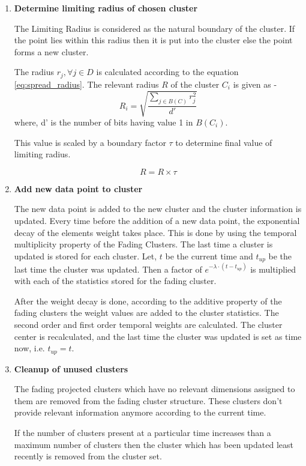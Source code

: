 \documentclass[review,twocolumn,5p]{elsarticle}
\begin{document}
\begin{enumerate}
\item \textbf{Determine limiting radius of chosen cluster}

The Limiting Radius is considered as the natural boundary of the cluster. If the point lies within this radius then it is put into the cluster else the point forms a new cluster. 

The radius $r_j, \forall j \in D$ is calculated according to the equation \ref{eq:spread_radius}. The relevant radius $R$ of the cluster $C_i$ is given as -
\begin{equation}
R_i = \sqrt{ \frac{\sum_{j \in B(C)} r_j^2}{d'} }
\end{equation}
where, d' is the number of bits having value 1 in $B(C_i)$.

This value is scaled by a boundary factor $\tau$ to determine final value of limiting radius. 

\begin{equation}
R = R \times \tau
\end{equation}

\item \textbf{Add new data point to cluster}

The new data point is added to the new cluster and the cluster information is updated. Every time before the addition of a new data point, the exponential decay of the elements weight takes place. This is done by using the temporal multiplicity property of the Fading Clusters. The last time a cluster is updated is stored for each cluster. Let, $t$ be the current time and $t_{up}$ be the last time the cluster was updated. Then a factor of $e^{- \lambda \cdot (t-t_{up})}$ is multiplied with each of the statistics stored for the fading cluster. 

After the weight decay is done, according to the additive property of the fading clusters the weight values are added to the cluster statistics. The second order and first order temporal weights are calculated. The cluster center is recalculated, and the last time the cluster was updated is set as time now, i.e. $t_{up} = t$.

\item \textbf{Cleanup of unused clusters}

The fading projected clusters which have no relevant dimensions assigned to them are removed from the fading cluster structure. These clusters don't provide relevant information anymore according to the current time. 

If the number of clusters present at a particular time increases than a maximum number of clusters then the cluster which has been updated least recently is removed from the cluster set. 
\end{enumerate}
\end{document}
